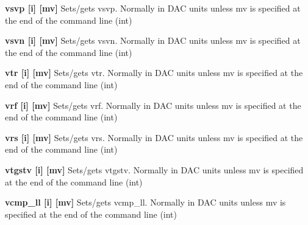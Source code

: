 \begin{DoxyItemize}
\item {\bfseries vsvp \mbox{[}i\mbox{]} \mbox{[}mv\mbox{]}} Sets/gets vsvp. Normally in DAC units unless {\ttfamily mv} is specified at the end of the command line (int)
\end{DoxyItemize}


\begin{DoxyItemize}
\item {\bfseries vsvn \mbox{[}i\mbox{]} \mbox{[}mv\mbox{]}} Sets/gets vsvn. Normally in DAC units unless {\ttfamily mv} is specified at the end of the command line (int)
\end{DoxyItemize}


\begin{DoxyItemize}
\item {\bfseries vtr \mbox{[}i\mbox{]} \mbox{[}mv\mbox{]}} Sets/gets vtr. Normally in DAC units unless {\ttfamily mv} is specified at the end of the command line (int)
\end{DoxyItemize}


\begin{DoxyItemize}
\item {\bfseries vrf \mbox{[}i\mbox{]} \mbox{[}mv\mbox{]}} Sets/gets vrf. Normally in DAC units unless {\ttfamily mv} is specified at the end of the command line (int)
\end{DoxyItemize}


\begin{DoxyItemize}
\item {\bfseries vrs \mbox{[}i\mbox{]} \mbox{[}mv\mbox{]}} Sets/gets vrs. Normally in DAC units unless {\ttfamily mv} is specified at the end of the command line (int)
\end{DoxyItemize}


\begin{DoxyItemize}
\item {\bfseries vtgstv \mbox{[}i\mbox{]} \mbox{[}mv\mbox{]}} Sets/gets vtgstv. Normally in DAC units unless {\ttfamily mv} is specified at the end of the command line (int)
\end{DoxyItemize}


\begin{DoxyItemize}
\item {\bfseries vcmp\_\-ll \mbox{[}i\mbox{]} \mbox{[}mv\mbox{]}} Sets/gets vcmp\_\-ll. Normally in DAC units unless {\ttfamily mv} is specified at the end of the command line (int)
\end{DoxyItemize}


